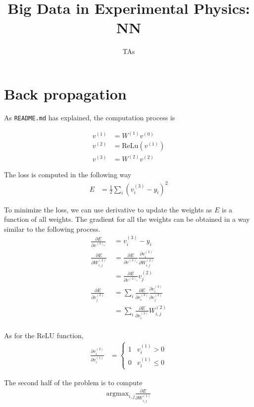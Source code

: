 \documentclass{article}
\title{\textbf{Big Data in Experimental Physics: NN}}
\author{TAs}
\begin{document}
\maketitle

\section{Back propagation}

As \texttt{README.md} has explained, the computation process is

\begin{align*}
  v^{(1)}&=W^{(1)}v^{(0)}\\
  v^{(2)}&=\text{ReLu}(v^{(1)})\\
  v^{(3)}&=W^{(2)}v^{(2)}
\end{align*}

The loss is computed in the following way
\begin{align*}
  E&=\frac{1}{2}\sum_{i}(v^{(3)}_i-y_i)^2
\end{align*}

\newcommand{\pfrac}[2]{\frac{\partial #1}{\partial #2}}

To minimize the loss, we can use derivative to update the weights as $E$ is a function of all weights. The gradient for all the weights can be obtained in a way similar to the following process.
\begin{align*}
  \pfrac{E}{v^{(3)_i}}&=v^{(3)}_i-y_i\\
  \pfrac{E}{W^{(2)}_{i,j}}\
  &=\pfrac{E}{v^{(3)_i}}\pfrac{v^{(3)}_i}{W^{(2)}_{i,j}}\\
  &=\pfrac{E}{v^{(3)_i}}v^{(2)}_j\\
  \pfrac{E}{v^{(2)}_j}
  &=\sum_i\pfrac{E}{v^{(3)}_i}\pfrac{v^{(3)}_i}{v^{(2)}_{j}}\\
  &=\sum_i\pfrac{E}{v^{(3)}_i}W^{(2)}_{i,j}\\
\end{align*}

As for the ReLU function,
\begin{align*}
  \pfrac{v^{(2)}_i}{v^{(1)}_i}
  &=\left\{
    \begin{array}{ll}
      1 & v^{(1)}_i>0\\
      0 & v^{(1)}_i\leq 0
    \end{array}
    \right.
\end{align*}

The second half of the problem is to compute
\begin{align*}
  \text{argmax}_{i,j}\pfrac{E}{W^{(1)}_{i,j}}
\end{align*}
\end{document}
